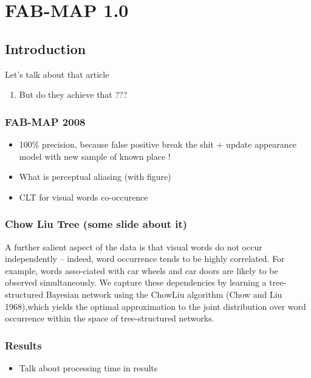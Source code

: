 \section{FAB-MAP 1.0}

\subsection{Introduction}
\begin{frame}{Let's talk about that article}
   \begin{enumerate}
       \item But do they achieve that ???
   \end{enumerate} 
\end{frame}


\begin{frame}
    \frametitle{FAB-MAP 2008}
    \begin{itemize}
        \item 100\% precision, because false positive break the shit + update appearance model with new sample of known place !
        \item What is perceptual aliasing (with figure)
        \item CLT for visual words co-occurence
    \end{itemize}
\end{frame}

\begin{frame}
    \frametitle{Chow Liu Tree (some slide about it)}
    A further salient aspect of the data is that visual words do not occur independently – indeed, word occurrence tends to be highly correlated. For example, words asso-ciated with car wheels and car doors are likely to be observed simultaneously. We capture these dependencies by learning a tree-structured Bayesian network using the ChowLiu algorithm (Chow and Liu 1968),which yields the optimal approximation to the joint distribution over word occurrence within the space of tree-structured networks.
\end{frame}

\begin{frame}
    \frametitle{Results}
    \begin{itemize}
        \item Talk about processing time in results
    \end{itemize}
\end{frame}
